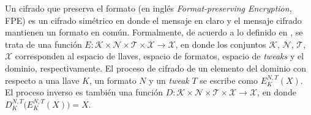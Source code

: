 Un cifrado que preserva el formato (en inglés \textit{Format-preserving
Encryption}, FPE) es un cifrado simétrico en donde el mensaje en claro y el
mensaje cifrado mantienen un formato en común. Formalmente, de acuerdo a lo
definido en \cite{DBLP:conf/sacrypt/BellareRRS09}, se trata de una función $ E:
\mathcal{K} \times \mathcal{N} \times \mathcal{T} \times \mathcal{X} \rightarrow
\mathcal{X} $, en donde los conjuntos $ \mathcal{K} $, $ \mathcal{N} $, $
\mathcal{T} $, $ \mathcal{X} $ corresponden al espacio de llaves, espacio de
formatos, espacio de \textit{tweaks} y el dominio, respectivamente. El proceso
de cifrado de un elemento del dominio con respecto a una llave $ K $, un formato
$ N $ y un \textit{tweak} $ T $ se escribe como  $ E_K^{N,T}(X) $. El proceso
inverso es también una función $ D: \mathcal{K} \times \mathcal{N} \times
\mathcal{T} \times \mathcal{X} \rightarrow \mathcal{X} $, en donde $
D_K^{N,T}\big( E_K^{N,T}(X) \big) = X $.






